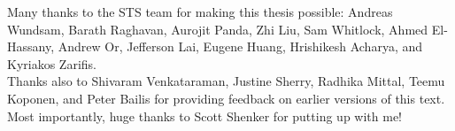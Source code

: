 Many thanks to the STS team for making this thesis possible: Andreas Wundsam,
Barath Raghavan, Aurojit Panda, Zhi Liu, Sam Whitlock, Ahmed
El-Hassany, Andrew Or, Jefferson Lai, Eugene Huang, Hrishikesh Acharya, and
Kyriakos Zarifis. \\

\noindent{}Thanks also to Shivaram Venkataraman, Justine Sherry, Radhika Mittal, Teemu
Koponen, and Peter Bailis for providing feedback on earlier versions of this
text. \\

\noindent{}Most importantly, huge thanks to Scott Shenker for putting up with me!
